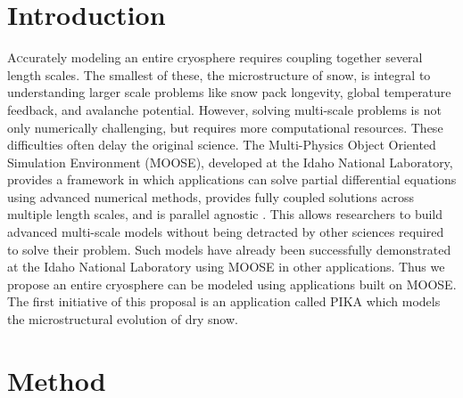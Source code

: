 
\begin{multicols}{2} %
\section{Introduction}

\lettrine[nindent=0em,lines=2]{A}ccurately modeling an entire cryosphere requires coupling together several length scales. The smallest of these, the microstructure of snow, is integral to understanding larger scale problems like snow pack longevity, global temperature feedback, and avalanche potential. However, solving multi-scale problems is not only numerically challenging, but requires more computational resources. These difficulties often delay the original science. The Multi-Physics Object Oriented Simulation Environment (MOOSE), developed at the Idaho National Laboratory, provides a framework in which applications can solve partial differential equations using advanced numerical methods, provides fully coupled solutions across multiple length scales, and is parallel agnostic \cite{Gaston_2009}. This allows researchers to build advanced multi-scale models without being detracted by other sciences required to solve their problem. Such models have already been successfully demonstrated at the Idaho National Laboratory using MOOSE in other applications. Thus we propose an entire cryosphere can be modeled using applications built on MOOSE. The first initiative of this proposal is an application called PIKA which models the microstructural evolution of dry snow.

\section{Method}


\end{multicols}
